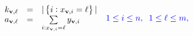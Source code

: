 \begin{displaymath}
	\begin{array}{lcl}
		k_{\mathbf{v},\ell} &=& |\left\lbrace i : x_{\mathbf{v},i}=\ell\right\rbrace|\\
		a_{\mathbf{v}, \ell} &=& \sum\limits_{i:x_{\mathbf{v},i}=\ell} y_{\mathbf{v},i}
	\end{array}\;\;\textcolor{blue}{1\leq i \leq n, \;\; 1\leq \ell \leq m,}
\end{displaymath}
